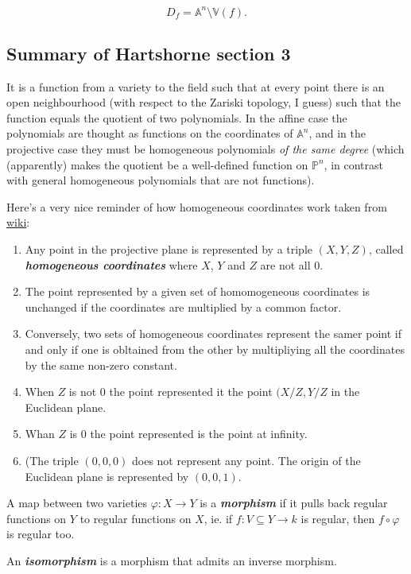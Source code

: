 \[D_f=\mathbb{A}^{n} \setminus \mathbb{V}(f).\]


\subsection{Summary of Hartshorne section 3}

\begin{defn}
	It is a function from a variety to the field such that at every point there is an open neighbourhood (with respect to the Zariski topology, I guess) such that the function equals the quotient of two polynomials. In the affine case the polynomials are thought as functions on the coordinates of $\mathbb{A}^n$, and in the projective case they must be homogeneous polynomials \textit{of the same degree} (which (apparently) makes the quotient be a well-defined function on $\mathbb{P}^n$, in contrast with general homogeneous polynomials that are not functions).
\end{defn}

Here's a very nice reminder of how homogeneous coordinates work taken from \href{https://en.wikipedia.org/wiki/Homogeneous_coordinates#Introduction}{wiki}:

\begin{enumerate}
\item Any point in the projective plane is represented by a triple $(X,Y,Z)$,  called \textit{\textbf{homogeneous coordinates}} where $X$, $Y$ and $Z$ are not all 0.
	\item The point represented by a given set of homomogeneous coordinates is unchanged if the coordinates are multiplied by a common factor.
		\item Conversely, two sets of homogeneous coordinates represent the samer point if and only if one is obltained from the other by multipliying all the coordinates by the same non-zero constant.
			\item When $Z$ is not 0 the point represented it the point $(X/Z,Y/Z$ in the Euclidean plane.
				\item Whan $Z$ is 0 the point represented is the point at infinity.
					\item (The triple  $(0,0,0)$ does not represent any point. The origin of the Euclidean plane is represented by $(0,0,1)$.
\end{enumerate}

\begin{defn}[Morphism]
	A map between two varieties $\varphi:X\to Y$ is a \textit{\textbf{morphism}} if it pulls back regular functions on $Y$ to regular functions on $X$, ie. if $f:V\subseteq Y\to k$ is regular, then $f\circ \varphi$ is regular too.

	An \textit{\textbf{isomorphism}} is a morphism that admits an inverse morphism.
\end{defn}

